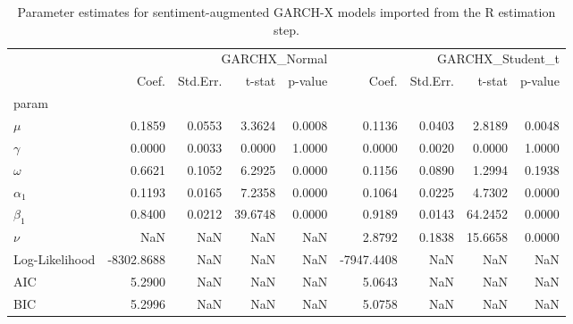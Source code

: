 \begin{table}
\caption{Parameter estimates for sentiment-augmented GARCH-X models imported from the R estimation step.}
\label{tab:garchx_params}
\begin{tabular}{lrrrrrrrr}
\toprule
 & \multicolumn{4}{r}{GARCHX_Normal} & \multicolumn{4}{r}{GARCHX_Student_t} \\
 & Coef. & Std.Err. & t-stat & p-value & Coef. & Std.Err. & t-stat & p-value \\
param &  &  &  &  &  &  &  &  \\
\midrule
$\mu$ & 0.1859 & 0.0553 & 3.3624 & 0.0008 & 0.1136 & 0.0403 & 2.8189 & 0.0048 \\
$\gamma$ & 0.0000 & 0.0033 & 0.0000 & 1.0000 & 0.0000 & 0.0020 & 0.0000 & 1.0000 \\
$\omega$ & 0.6621 & 0.1052 & 6.2925 & 0.0000 & 0.1156 & 0.0890 & 1.2994 & 0.1938 \\
$\alpha_1$ & 0.1193 & 0.0165 & 7.2358 & 0.0000 & 0.1064 & 0.0225 & 4.7302 & 0.0000 \\
$\beta_1$ & 0.8400 & 0.0212 & 39.6748 & 0.0000 & 0.9189 & 0.0143 & 64.2452 & 0.0000 \\
$\nu$ & NaN & NaN & NaN & NaN & 2.8792 & 0.1838 & 15.6658 & 0.0000 \\
Log-Likelihood & -8302.8688 & NaN & NaN & NaN & -7947.4408 & NaN & NaN & NaN \\
AIC & 5.2900 & NaN & NaN & NaN & 5.0643 & NaN & NaN & NaN \\
BIC & 5.2996 & NaN & NaN & NaN & 5.0758 & NaN & NaN & NaN \\
\bottomrule
\end{tabular}
\end{table}
